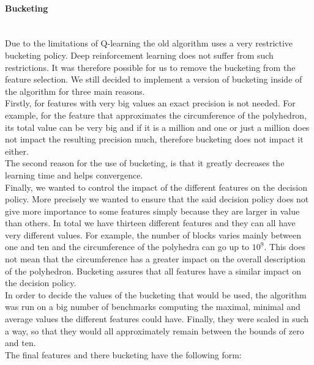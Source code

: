 \paragraph{Bucketing}\mbox{}\\
Due to the limitations of Q-learning the old algorithm uses a very restrictive bucketing policy. Deep reinforcement learning does not suffer from such restrictions. It was therefore possible for us to remove the bucketing from the feature selection. We still decided to implement a version of bucketing inside of the algorithm for three main reasons. \\
Firstly, for features with very big values an exact precision is not needed. For example, for the feature that approximates the circumference of the polyhedron, its total value can be very big and if it is a million and one or just a million does not impact the resulting precision much, therefore bucketing does not impact it either. \\
The second reason for the use of bucketing, is that it greatly decreases the learning time and helps convergence. \\
Finally, we wanted to control the impact of the different features on the decision policy. More precisely we wanted to ensure that the said decision policy does not give more importance to some features simply because they are larger in value than others. In total we have thirteen different features and they can all have very different values. For example, the number of blocks varies mainly between one and ten and the circumference of the polyhedra can go up to $10^9$. This does not mean that the circumference has a greater impact on the overall description of the polyhedron. Bucketing assures that all features have a similar impact on the decision policy.\\
In order to decide the values of the bucketing that would be used,  the algorithm was run on a big number of benchmarks computing the maximal, minimal and average values the different features could have. Finally, they were scaled in such a way, so that they would all approximately remain between the bounds of zero and ten.\\
The final features and there bucketing have the following form:
